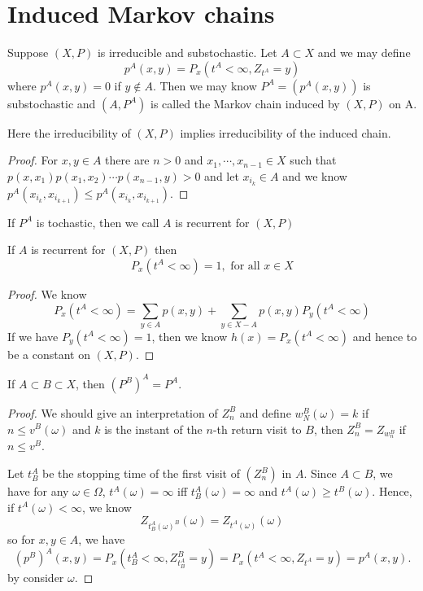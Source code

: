 \documentclass[lang=en, color=blue, ]{elegantbook}
\begin{document}
\section{Induced Markov chains}

\begin{definition}
    Suppose $(X,P)$ is irreducible and substochastic. Let $A\subset X$ and we may define
    \[p^A(x,y) = P_x(t^A < \infty, Z_{t^A} = y)\]
    where $p^A(x,y) = 0$ if $y\notin A$. Then we may know $P^A = (p^A(x,y))$ is substochastic and $(A,P^A)$ is called the Markov chain induced by $(X,P)$ on A.\par
    Here the irreducibility of $(X,P)$ implies irreducibility of the induced chain.
\end{definition}
\begin{proof}
    For $x,y\in A$ there are $n>0$ and $x_1,\cdots,x_{n-1}\in X$ such that $p(x,x_1)p(x_1,x_2)\cdots p(x_{n-1},y) > 0$ and let $x_{i_k} \in A$ and we know $p^A(x_{i_k},x_{i_{k+1}}) \leq p^A(x_{i_k},x_{i_{k+1}})$.
\end{proof}

\begin{definition}
    If $P^A$ is tochastic, then we call $A$ is recurrent for $(X,P)$
\end{definition}

\begin{lemma}
    If $A$ is recurrent for $(X,P)$ then
    \[P_x(t^A < \infty) = 1,\text{ for all }x\in X\]
\end{lemma}
\begin{proof}
    We know
    \[
    P_x(t^A < \infty) = \sum\limits_{y\in A}p(x,y) + \sum\limits_{y\in X-A}p(x,y)P_y(t^A < \infty)
    \]
    If we have $P_y(t^A < \infty)= 1$, then we know $h(x) = P_x(t^A < \infty)$ and hence to be a constant on $(X,P)$.
\end{proof}

\begin{theorem}
    If $A\subset B \subset X$, then $(P^B)^A = P^A$.
\end{theorem}
\begin{proof}
    We should give an interpretation of $Z_n^B$ and define $w_N^B(\omega) = k$ if $n\leq v^B(\omega)$ and $k$ is the instant of the $n$-th return visit to $B$, then $Z_n^B = Z_{w_n^B}$ if $n \leq v^B$.\par
    Let $t^A_B$ be the stopping time of the first visit of $(Z_n^B)$ in $A$. Since $A\subset B$, we have for any $\omega \in \Omega$, $t^A(\omega) = \infty$ iff $t^A_B(\omega) = \infty$ and $t^A(\omega) \geq t^B(\omega)$. Hence, if $t^A(\omega) < \infty$, we know
    \[
    Z_{t_B^A(\omega)^B}(\omega) = Z_{t^A(\omega)}(\omega)
    \]
    so for $x,y \in A$, we have
    \[
    (p^B)^A(x,y) = P_x(t_B^A < \infty, Z_{t_B^A}^B = y) = P_x(t^A < \infty, Z_{t^A} = y) = p^A(x,y).
    \]
    by consider $\omega$.
\end{proof}
\end{document}
